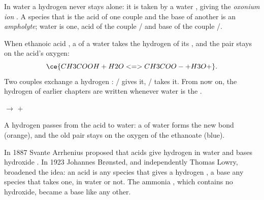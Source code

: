 \begin{definition}\label{def:g12:ka-and-pka:oxonium}
In water a hydrogen  never stays alone: it is taken by a water
, giving the \emph{oxonium ion} . A
species that is the acid of one couple and the base of another is an
\emph{ampholyte}; water is one, acid of the couple
/ and base of the couple /.
\end{definition}

\begin{example}\label{ex:g12:ka-and-pka:acid-water}
When ethanoic acid , a  of a water  takes the
hydrogen of its , and the  pair stays on the acid's oxygen:
\[
  \ce{CH3COOH + H2O <=> CH3COO- + H3O+} .
\]
Two couples exchange a hydrogen : / gives it,
/ takes it. From now on, the hydrogen  of earlier
chapters are written  whenever water is the .
\end{example}

\begin{omfigure}
\qquad
{}
\qquad$\longrightarrow$\qquad
{}\quad$+$\quad{}

{\small A hydrogen  passes from the acid to water: a  of
water forms the new  bond (orange), and the old  pair
stays on the oxygen of the ethanoate  (blue).}
\end{omfigure}

\begin{history}
In 1887 Svante Arrhenius proposed that acids give hydrogen  in water
and bases hydroxide . In 1923 Johannes Brønsted, and independently
Thomas Lowry, broadened the idea: an acid is any species that gives a
hydrogen , a base any species that takes one, in water or not. The
ammonia , which contains no hydroxide, became a base like any
other.
\end{history}

